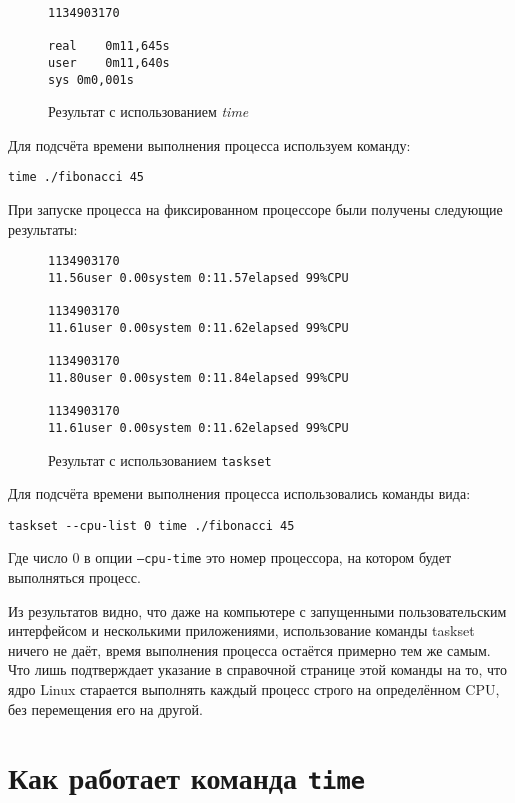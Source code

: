 \documentclass[12pt,a4paper]{article}
\begin{document}
\begin{figure}[h]
\begin{verbatim}
1134903170

real	0m11,645s
user	0m11,640s
sys	0m0,001s
\end{verbatim}
\label{result_with_only_time}
\caption{Результат с использованием \textit{time}}
\end{figure}

Для подсчёта времени выполнения процесса используем команду:

\begin{verbatim}
time ./fibonacci 45
\end{verbatim}

При запуске процесса на фиксированном процессоре были получены следующие результаты:

\begin{figure}[h]
\begin{verbatim}
1134903170
11.56user 0.00system 0:11.57elapsed 99%CPU

1134903170
11.61user 0.00system 0:11.62elapsed 99%CPU

1134903170
11.80user 0.00system 0:11.84elapsed 99%CPU

1134903170
11.61user 0.00system 0:11.62elapsed 99%CPU
\end{verbatim}
\caption{Результат с использованием \texttt{taskset}}
\end{figure}

Для подсчёта времени выполнения процесса использовались команды вида:

\begin{verbatim}
taskset --cpu-list 0 time ./fibonacci 45
\end{verbatim}

Где число 0 в опции \texttt{--cpu-time} это номер процессора, на котором будет выполняться процесс.

Из результатов видно, что даже на компьютере с запущенными пользовательским интерфейсом и несколькими приложениями, 
использование команды taskset ничего не даёт, время выполнения процесса остаётся примерно тем же самым. Что лишь 
подтверждает указание в справочной странице этой команды на то, что ядро Linux старается выполнять каждый процесс 
строго на определённом CPU, без перемещения его на другой.

\section{Как работает команда \texttt{time}}
\end{document}

